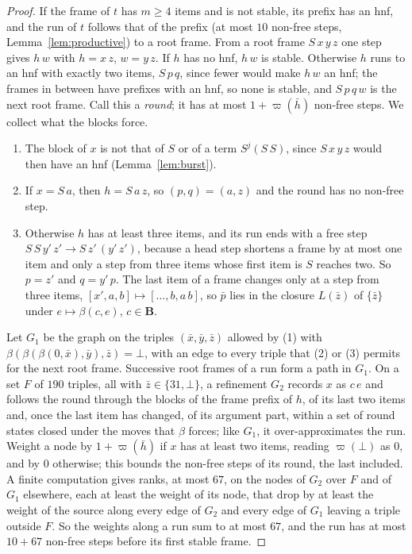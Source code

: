 \documentclass[11pt]{amsart}
\theoremstyle{definition}
\newcommand{\B}{\mathbf B}
\begin{document}
\begin{proof}
If the frame of $t$ has $m\ge4$ items and is not stable, its prefix has an hnf, and the run of $t$
follows that of the prefix (at most $10$ non-free steps, Lemma~\ref{lem:productive}) to a root frame.
From a root frame $S\,x\,y\,z$ one step gives $h\,w$ with $h=x\,z$, $w=y\,z$. If $h$ has no hnf, $h\,w$
is stable. Otherwise $h$ runs to an hnf with exactly two items, $S\,p\,q$, since fewer would make
$h\,w$ an hnf; the frames in between have prefixes with an hnf, so none is stable, and $S\,p\,q\,w$ is
the next root frame. Call this a \emph{round}; it has at most $1+\varpi(\bar h)$ non-free steps. We
collect what the blocks force.
\begin{enumerate}
\item The block of $x$ is not that of $S$ or of a term $S^j(S\,S)$, since $S\,x\,y\,z$ would then have
  an hnf (Lemma~\ref{lem:burst}).
\item If $x=S\,a$, then $h=S\,a\,z$, so $(p,q)=(a,z)$ and the round has no non-free step.
\item Otherwise $h$ has at least three items, and its run ends with a free step
  $S\,S\,y'\,z'\to S\,z'\,(y'\,z')$, because a head step shortens a frame by at most one item and only
  a step from three items whose first item is $S$ reaches two. So $p=z'$ and $q=y'\,p$. The last item of a frame
  changes only at a step from three items, $[x',a,b]\mapsto[\dots,b,a\,b]$, so $\bar p$ lies in the
  closure $L(\bar z)$ of $\{\bar z\}$ under $e\mapsto\beta(c,e)$, $c\in\B$.
\end{enumerate}
\sloppy
Let $G_1$ be the graph on the triples $(\bar x,\bar y,\bar z)$ allowed by (1) with
$\beta(\beta(\beta(0,\bar x),\bar y),\bar z)=\bot$, with an edge to every triple that (2) or (3)
permits for the next root frame. Successive root frames of a run form a path in $G_1$. On a set $F$ of $190$ triples, all with $\bar z\in\{31,\bot\}$, a refinement $G_2$ records $x$ as
$c\,e$ and follows the round through the blocks of the frame prefix of $h$, of its last two items
and, once the last item has changed, of its argument part, within a set of round states closed
under the moves that $\beta$ forces; like $G_1$, it over-approximates the run. Weight a node by
$1+\varpi(\bar h)$ if $x$ has at least two items, reading $\varpi(\bot)$ as $0$, and by $0$
otherwise; this bounds the non-free steps of its round, the last included. A finite computation
gives ranks, at most $67$, on the nodes of $G_2$ over $F$ and of $G_1$ elsewhere, each at least the
weight of its node, that drop by at least the weight of the source along every edge of $G_2$ and
every edge of $G_1$ leaving a triple outside $F$. So the weights along a run sum to at most $67$, and the run has at most
$10+67$ non-free steps before its first stable frame.
\end{proof}
\end{document}
